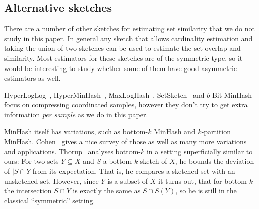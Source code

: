 
\subsection{Alternative sketches}

There are a number of other sketches for estimating set similarity that we do not study in this paper.
In general any sketch that allows cardinality estimation and taking the union of two sketches can be used to estimate the set overlap and similarity.
Most estimators for these sketches are of the symmetric type, so it would be interesting to study whether some of them have good asymmetric estimators as well.

HyperLogLog~\cite{flajolet2007hyperloglog}, HyperMinHash~\cite{yu2020hyperminhash}, MaxLogHash~\cite{wang2019memory}, SetSketch~\cite{DBLP:journals/corr/abs-2101-00314} and $b$-Bit MinHash~\cite{li2010b} focus on compressing coordinated samples, however they don't try to get extra information \emph{per sample} as we do in this paper.

MinHash itself has variations, such as bottom-$k$ MinHash and $k$-partition MinHash.
Cohen~\cite{DBLP:reference/algo/Cohen16b} gives a nice survey of those as well as many more variations and applications.
Thorup~\cite{thorup2013bottom} analyses bottom-$k$ in a setting superficially similar to ours: For two sets $Y\subseteq X$ and $S$ a bottom-$k$ sketch of $X$, he bounds the deviation of $|S\cap Y$ from its expectation.
That is, he compares a sketched set with an unsketched set.
However, since $Y$ is a subset of $X$ it turns out, that for bottom-$k$ the intersection $S\cap Y$ is exactly the same as $S\cap S(Y)$, so he is still in the classical ``symmetric'' setting.


